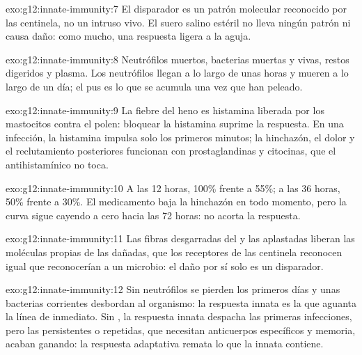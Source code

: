 \begin{solution}{exo:g12:innate-immunity:7}
El disparador es un patrón molecular reconocido por las 
centinela, no un intruso vivo. El suero salino estéril no lleva ningún
patrón ni causa daño: como mucho, una respuesta ligera a la aguja.
\end{solution}

\begin{solution}{exo:g12:innate-immunity:8}
Neutrófilos muertos, bacterias muertas y vivas, restos digeridos y
plasma. Los neutrófilos llegan a lo largo de unas horas y mueren a lo
largo de un día; el pus es lo que se acumula una vez que han peleado.
\end{solution}

\begin{solution}{exo:g12:innate-immunity:9}
La fiebre del heno es histamina liberada por los mastocitos contra el
polen: bloquear la histamina suprime la respuesta. En una infección, la
histamina impulsa solo los primeros minutos; la hinchazón, el dolor y
el reclutamiento posteriores funcionan con prostaglandinas y citocinas,
que el antihistamínico no toca.
\end{solution}

\begin{solution}{exo:g12:innate-immunity:10}
A las 12 horas, 100\% frente a 55\%; a las 36 horas, 50\% frente a
30\%. El medicamento baja la hinchazón en todo momento, pero la curva
sigue cayendo a cero hacia las 72 horas: no acorta la respuesta.
\end{solution}

\begin{solution}{exo:g12:innate-immunity:11}
Las fibras desgarradas del  y las  aplastadas liberan
las moléculas propias de las  dañadas, que los receptores de las
 centinela reconocen igual que reconocerían a un microbio: el
daño por sí solo es un disparador.
\end{solution}

\begin{solution}{exo:g12:innate-immunity:12}
Sin neutrófilos se pierden los primeros días y unas bacterias
corrientes desbordan al organismo: la respuesta innata es la que
aguanta la línea de inmediato. Sin , la respuesta
innata despacha las primeras infecciones, pero las persistentes o
repetidas, que necesitan anticuerpos específicos y memoria, acaban
ganando: la respuesta adaptativa remata lo que la innata contiene.
\end{solution}

